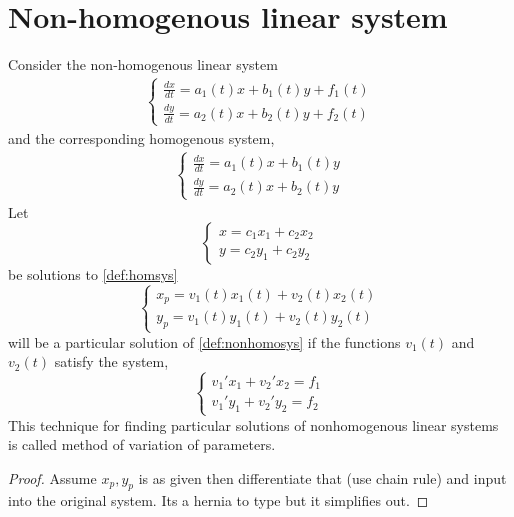 \documentclass[oneside,11pt,pdftex,final]{book}%
\numberwithin{equation}{section}
\newtheorem{example}[theorem]{Example}
\numberwithin{section}{chapter}
\numberwithin{equation}{chapter}
\begin{document}
\section{Non-homogenous linear system}
Consider the non-homogenous linear system
\begin{align}\label{def:nonhomosys}
	\begin{cases}
	\frac{dx}{dt}=a_1(t)x+b_1(t)y+f_1(t)\\
	\frac{dy}{dt}=a_2(t)x+b_2(t)y+f_2(t)
\end{cases}
\end{align}
and the corresponding homogenous system,
\begin{align} \label{def:homsys}
	\begin{cases}
		\frac{dx}{dt}=a_1(t)x+b_1(t)y\\
		\frac{dy}{dt}=a_2(t)x+b_2(t)y
	\end{cases}
\end{align} 
Let \[ \begin{cases}
	x=c_1x_1+c_2x_2\\
	y=c_2y_1+c_2y_2
\end{cases} \]
be solutions to \ref{def:homsys}
\[ \begin{cases}
	x_p=v_1(t)x_1(t)+v_2(t)x_2(t)\\
	y_p=v_1(t)y_1(t)+v_2(t)y_2(t)
\end{cases} \]
will be a particular solution of \ref{def:nonhomosys} if the functions $ v_1(t) $ and $ v_2(t) $ satisfy the system,
\[ \begin{cases}
	v_1'x_1+v_2'x_2=f_1\\
	v_1'y_1+v_2'y_2=f_2
\end{cases} \]
This technique for finding particular solutions of nonhomogenous linear systems is called method of variation of parameters.
\begin{proof}
	Assume $x_p, y_p $ is as given then differentiate that (use chain rule) and input into the original system. Its a hernia to type but it simplifies out.
\end{proof}
\end{document}
